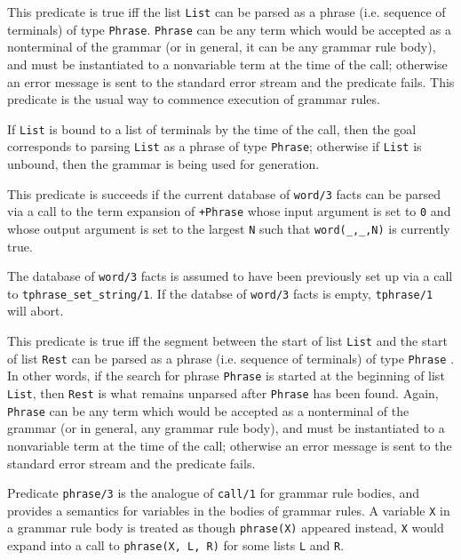 \begin{description}

    This predicate is true iff the list {\tt List} can be parsed as a phrase 
    (i.e. sequence of terminals) of type {\tt Phrase}.  {\tt Phrase} can be 
    any term which would
    be accepted as a nonterminal of the grammar (or in general, it can 
    be any  grammar rule body), and must be instantiated to a
    nonvariable term  at the time of the call; otherwise an error
    message is sent to the standard error stream and the predicate fails. 
    This predicate is the usual way to commence execution of grammar rules.

    If {\tt List} is bound to a list of terminals by the time of the call,
    then the goal corresponds to parsing {\tt List} as a phrase of type
    {\tt Phrase}; otherwise if {\tt List} is unbound, then the grammar
    is being used for generation.

 This predicate is
    succeeds if the current database of {\tt word/3} facts can be
    parsed via a call to the term expansion of {\tt +Phrase} whose
    input argument is set to {\tt 0} and whose output argument is set
    to the largest {\tt N} such that {\tt word(\_,\_,N)} is currently
    true.  

    The database of {\tt word/3} facts is assumed to have been
    previously set up via a call to {\tt tphrase\_set\_string/1}.  If
    the databse of {\tt word/3} facts is empty, {\tt tphrase/1} will
    abort.


    This predicate is true iff the segment between the start of list 
    {\tt List} and the start of list {\tt Rest} can be parsed as a phrase 
    (i.e. sequence of terminals) of type {\tt Phrase} . In other words, if 
    the search for phrase 
    {\tt Phrase} is started at the beginning of list {\tt List}, then 
    {\tt Rest} is what remains unparsed after {\tt Phrase} has been
    found. Again, {\tt Phrase} can be any term which
    would be accepted as a nonterminal of the grammar (or in general, any
    grammar rule body), and must be instantiated to a nonvariable term
    at the time of the call; otherwise an error message is sent to the
    standard error stream and the predicate fails.

    Predicate {\tt phrase/3} is the analogue of {\tt call/1} for grammar
    rule bodies, and provides a semantics for variables in the bodies of
    grammar rules.  A variable {\tt X} in a grammar rule body is treated
    as though {\tt phrase(X)} appeared instead, {\tt X} would expand into 
    a call to {\tt phrase(X, L, R)} for some lists {\tt L} and {\tt R}.  


\end{description}
